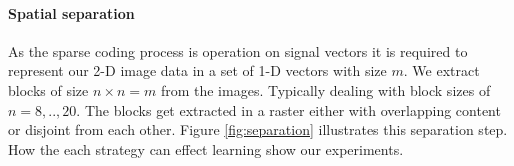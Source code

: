 \paragraph{Spatial separation}
As the sparse coding process is operation on signal vectors it is required to
represent our 2-D image data in a set of 1-D vectors with size $m$. We extract
blocks of size $n \times n=m$ from the images. Typically dealing with block
sizes of $n=8,..,20$. The blocks get extracted in a raster either with
overlapping content or disjoint from each other. Figure \ref{fig:separation}
illustrates this separation step. How the each strategy can effect learning
show our experiments.
\begin{figure}[h]
\centering
{}
\hspace{5mm}
\subfloat[]{\includegraphics[scale =
}
\end{figure}

